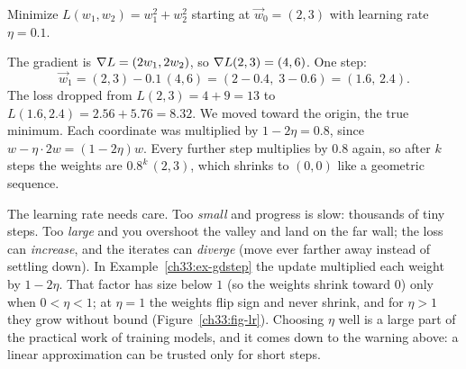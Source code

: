 \begin{example}
\label{ch33:ex-gdstep}
Minimize $L(w_1,w_2)=w_1^2 + w_2^2$ starting at $\vec w_0=(2,3)$ with learning
rate $\eta=0.1$.

The gradient is $\nabla L = (2w_1, 2w_2)$, so $\nabla L(2,3) = (4,6)$. One step:
\[
  \vec w_1 = (2,3) - 0.1\,(4,6) = (2-0.4,\; 3-0.6) = (1.6,\,2.4).
\]
The loss dropped from $L(2,3)=4+9=13$ to $L(1.6,2.4)=2.56+5.76=8.32$. We moved
toward the origin, the true minimum. Each coordinate was multiplied by
$1-2\eta = 0.8$, since $w-\eta\cdot 2w=(1-2\eta)w$. Every further step multiplies
by $0.8$ again, so after $k$ steps the weights are $0.8^k\,(2,3)$, which shrinks to
$(0,0)$ like a geometric sequence.
\end{example}

\begin{trapbox}
The learning rate needs care. Too \emph{small} and progress is slow: thousands of
tiny steps. Too \emph{large} and you overshoot the valley and land on the far
wall; the loss can \emph{increase}, and the iterates can \emph{diverge} (move
ever farther away instead of settling down). In Example~\ref{ch33:ex-gdstep} the
update multiplied each weight by $1-2\eta$. That factor has size below $1$ (so the
weights shrink toward $0$) only when $0<\eta<1$; at $\eta=1$ the weights flip
sign and never shrink, and for $\eta>1$ they grow without bound
(Figure~\ref{ch33:fig-lr}). Choosing $\eta$ well is a large part of the practical
work of training models, and it comes down to the warning above: a linear
approximation can be trusted only for short steps.
\end{trapbox}

